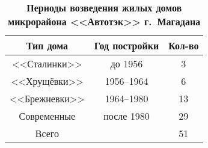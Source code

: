 
\begin{wraptable}{l}{7.0cm}
  \caption*{\textbf{Периоды возведения жилых домов\\микрорайона <<Автотэк>> г.~Магадана} }
  \label{tab:sydchak-tab}
  \begin{tabular}{ccc}
\toprule
  Тип дома    & Год постройки & Кол-во \\
\midrule
  <<Сталинки>>    & до 1956       & 3      \\
  <<Хрущёвки>>    & 1956--1964     & 6      \\
  <<Брежневки>>   & 1964--1980     & 13     \\
  Современные & после 1980    & 29     \\\midrule
  Всего       &               & 51\\ \bottomrule
  \end{tabular}


\end{wraptable}
